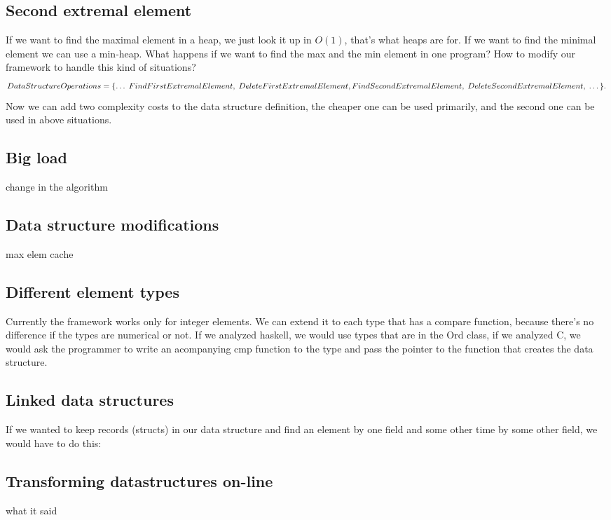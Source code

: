 \documentclass[11pt]{article}
\begin{document}
	\subsection{Second extremal element}
		If we want to find the maximal element in a heap, we just look it up in $O(1)$, that's what heaps are for. 
		If we want to find the minimal element we can use a min-heap. What happens if we want to find the max and the min element in one program? 
		How to modify our framework to handle this kind of situations?
		\begin{equation}
		  	DataStructureOperations = \{\dots \; FindFirstExtremalElement,\; DeleteFirstExtremalElement, \; \\
			FindSecondExtremalElement,\; DeleteSecondExtremalElement, \; \dots\}.
		\end{equation}
		Now we can add two complexity costs to the data structure definition, the cheaper one can be used primarily, and the second one can be used in above situations.
	\subsection{Big load}
		change in the algorithm
	\subsection{Data structure modifications}
		
		max elem cache
	\subsection{Different element types}
		Currently the framework works only for integer elements. We can extend it to each type that has a compare function,
		because there's no difference if the types are numerical or not.
		If we analyzed haskell, we would use types that are in the Ord class,
		if we analyzed C, we would ask the programmer to write an acompanying cmp function to the type and pass the pointer to the function that creates the data structure.
	\subsection{Linked data structures}
		If we wanted to keep records (structs) in our data structure and find an element by one field and some other time by some other field, we would have to do this:
	\subsection{Transforming datastructures on-line}
		what it said
\end{document}
